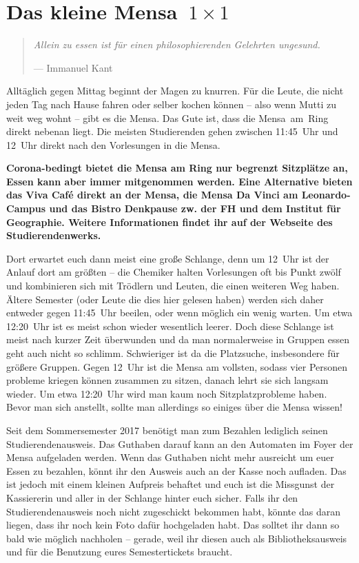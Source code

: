 \section[Das kleine Mensa~1~×~1]{\boldmath Das kleine Mensa~${1 \times 1}$}
\begin{multicols*}{2}
\begin{quote}
	\textit{Allein zu essen ist für einen philosophierenden Gelehrten ungesund.}
	
	\hfill--- Immanuel Kant
\end{quote}

Alltäglich gegen Mittag beginnt der Magen zu knurren.
Für die Leute, die nicht jeden Tag nach Hause fahren oder selber kochen können -- also wenn Mutti zu weit weg wohnt -- gibt es die Mensa.
Das Gute ist, dass die Mensa~am~Ring direkt nebenan liegt.
Die meisten Studierenden gehen zwischen 11:45~Uhr und 12~Uhr direkt nach den Vorlesungen in die Mensa.

\textbf{Corona-bedingt bietet die Mensa am Ring nur begrenzt Sitzplätze an, Essen kann aber immer mitgenommen werden. Eine Alternative bieten das Viva Café direkt an der Mensa, die Mensa Da Vinci am Leonardo-Campus und das Bistro Denkpause zw. der FH und dem Institut für Geographie. Weitere Informationen findet ihr auf der Webseite des Studierendenwerks.}

Dort erwartet euch dann meist eine große Schlange, denn um 12~Uhr ist der Anlauf dort am größten – die Chemiker halten Vorlesungen oft bis Punkt zwölf und kombinieren sich mit Trödlern und Leuten, die einen weiteren Weg haben. Ältere Semester (oder Leute die dies hier gelesen haben) werden sich daher entweder gegen 11:45~Uhr beeilen, oder wenn möglich ein wenig warten. Um etwa 12:20~Uhr ist es meist schon wieder wesentlich leerer.
Doch diese Schlange ist meist nach kurzer Zeit überwunden und da man normalerweise in Gruppen essen geht auch nicht so schlimm. Schwieriger ist da die Platzsuche, insbesondere für größere Gruppen. Gegen 12~Uhr ist die Mensa am vollsten, sodass vier Personen probleme kriegen können zusammen zu sitzen, danach lehrt sie sich langsam wieder. Um etwa 12:20~Uhr wird man kaum noch Sitzplatzprobleme haben.
Bevor man sich anstellt, sollte man allerdings so einiges über die Mensa wissen!

Seit dem Sommersemester 2017 benötigt man zum Bezahlen lediglich seinen Studierendenausweis.
Das Guthaben darauf kann an den Automaten im Foyer der Mensa aufgeladen werden.
Wenn das Guthaben nicht mehr ausreicht um euer Essen zu bezahlen, könnt ihr den Ausweis auch an der Kasse noch aufladen. 
Das ist jedoch mit einem kleinen Aufpreis behaftet und euch ist die Missgunst der Kassiererin und aller in der Schlange hinter euch sicher.
Falls ihr den Studierendenausweis noch nicht zugeschickt bekommen habt, könnte das daran liegen, dass ihr noch kein Foto dafür hochgeladen habt.
Das solltet ihr dann so bald wie möglich nachholen -- gerade, weil ihr diesen auch als Bibliotheksausweis und für die Benutzung eures Semestertickets braucht.


\end{multicols*}
